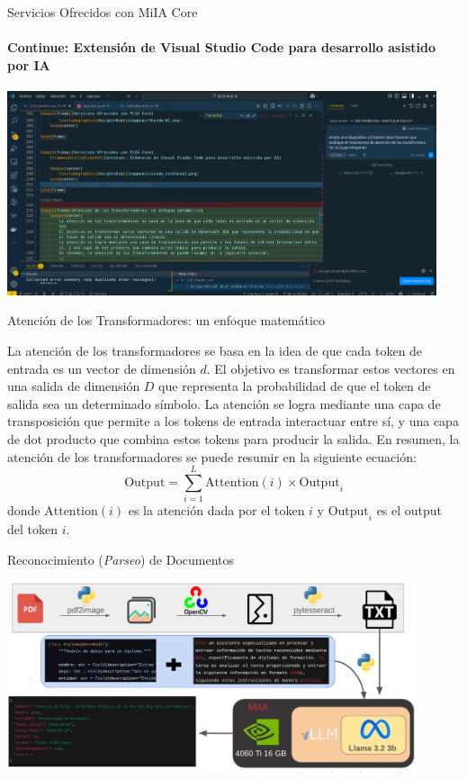 \documentclass[aspectratio=169]{beamer}
\begin{document}
\begin{frame}{Servicios Ofrecidos con MiIA Core}
    \framesubtitle{\textbf{Continue}: Extensión de Visual Studio Code para desarrollo asistido por IA}

    \begin{center}
        \includegraphics[height=6cm]{imagenes/vscode_continue3.png}
    \end{center}

\end{frame}

\begin{frame}{Atención de los Transformadores: un enfoque matemático}
    \begin{center}
        La atención de los transformadores se basa en la idea de que cada token de entrada es un vector de dimensión $d$.
        El objetivo es transformar estos vectores en una salida de dimensión $D$ que representa la probabilidad de que el token de salida sea un determinado símbolo.
        La atención se logra mediante una capa de transposición que permite a los tokens de entrada interactuar entre sí, y una capa de dot producto que combina estos tokens para producir la salida.
        En resumen, la atención de los transformadores se puede resumir en la siguiente ecuación:
        \[
        \text{Output} = \sum_{i=1}^{L} \text{Attention}(i) \times \text{Output}_i
        \]
        donde $\text{Attention}(i)$ es la atención dada por el token $i$ y $\text{Output}_i$ es el output del token $i$.
    \end{center}
\end{frame}

\begin{frame}{Reconocimiento (\textit{Parseo}) de Documentos}
        \begin{center}
            \includegraphics[width=12cm]{imagenes/epf.png}
        \end{center}
\end{frame}
\end{document}

